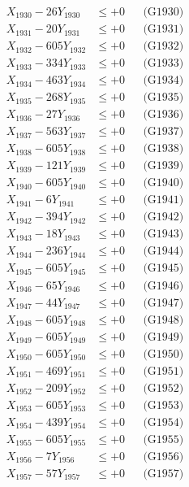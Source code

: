 \documentclass[a4paper,10pt]{article}
\begin{document}
{\begin{align}
X_{1930} - 26Y_{1930} &\leq +0 && \text{(G1930)} \\
\allowbreak
X_{1931} - 20Y_{1931} &\leq +0 && \text{(G1931)} \\
X_{1932} - 605Y_{1932} &\leq +0 && \text{(G1932)} \\
X_{1933} - 334Y_{1933} &\leq +0 && \text{(G1933)} \\
X_{1934} - 463Y_{1934} &\leq +0 && \text{(G1934)} \\
X_{1935} - 268Y_{1935} &\leq +0 && \text{(G1935)} \\
X_{1936} - 27Y_{1936} &\leq +0 && \text{(G1936)} \\
X_{1937} - 563Y_{1937} &\leq +0 && \text{(G1937)} \\
X_{1938} - 605Y_{1938} &\leq +0 && \text{(G1938)} \\
X_{1939} - 121Y_{1939} &\leq +0 && \text{(G1939)} \\
X_{1940} - 605Y_{1940} &\leq +0 && \text{(G1940)} \\
\allowbreak
X_{1941} - 6Y_{1941} &\leq +0 && \text{(G1941)} \\
X_{1942} - 394Y_{1942} &\leq +0 && \text{(G1942)} \\
X_{1943} - 18Y_{1943} &\leq +0 && \text{(G1943)} \\
X_{1944} - 236Y_{1944} &\leq +0 && \text{(G1944)} \\
X_{1945} - 605Y_{1945} &\leq +0 && \text{(G1945)} \\
X_{1946} - 65Y_{1946} &\leq +0 && \text{(G1946)} \\
X_{1947} - 44Y_{1947} &\leq +0 && \text{(G1947)} \\
X_{1948} - 605Y_{1948} &\leq +0 && \text{(G1948)} \\
X_{1949} - 605Y_{1949} &\leq +0 && \text{(G1949)} \\
X_{1950} - 605Y_{1950} &\leq +0 && \text{(G1950)} \\
\allowbreak
X_{1951} - 469Y_{1951} &\leq +0 && \text{(G1951)} \\
X_{1952} - 209Y_{1952} &\leq +0 && \text{(G1952)} \\
X_{1953} - 605Y_{1953} &\leq +0 && \text{(G1953)} \\
X_{1954} - 439Y_{1954} &\leq +0 && \text{(G1954)} \\
X_{1955} - 605Y_{1955} &\leq +0 && \text{(G1955)} \\
X_{1956} - 7Y_{1956} &\leq +0 && \text{(G1956)} \\
X_{1957} - 57Y_{1957} &\leq +0 && \text{(G1957)} \\

\end{align}}
\end{document}
